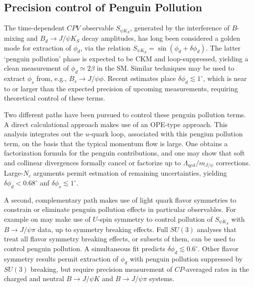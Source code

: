 \subsection{Precision control of Penguin Pollution}
The time-dependent $CPV$ observable $S_{\psi K_S}$, generated by the interference of $B$-mixing and $B_d \to J/\psi K_S$ decay amplitudes, has long been considered a golden mode for extraction of $\phi_d$, via the relation $S_{\psi K_S} = \sin (\phi_d + \delta \phi_d)$. The latter `penguin pollution' phase is expected to be CKM and loop-suppressed, yielding a clean measurement of $\phi_d \simeq 2 \beta$ in the SM. Similar techniques may be used to extract $\phi_s$ from, e.g., $B_s \to J/\psi \phi$. Recent estimates place $\delta \phi_d \lesssim 1^\circ$, which is near to or larger than the expected precision of upcoming measurements, requiring theoretical control of these terms.

Two different paths have been pursued to control these penguin pollution terms. A direct calculational approach makes use of an OPE-type approach. This analysis integrates out the $u$-quark loop, associated with this pengiun pollution term, on the basis that the typical momentum flow is large. One obtains a factorization formula for the penguin contributions, and one may show that soft and collinear divergences formally cancel or factorize up to $\Lambda_{\text{qcd}}/m_{J/\psi}$ corrections. Large-$N_c$ arguments permit estmation of remaining uncertainties, yielding $\delta \phi_d < 0.68^\circ$ anf $\delta \phi_s \lesssim 1^\circ$. 

A second, complementary path makes use of light quark flavor symmetries to constrain or eliminate penguin pollution effects in particular observables. For example on may make use of $U$-spin symmetry to  control pollution of $S_{\psi K_S}$ with $B \to J/\psi \pi$ data, up to symmetry breaking effects. Full $SU(3)$ analyses that treat all flavor symmetry breaking effects, or subsets of them, can be used to control penguin pollution. A simultaneous fit predicts $\delta \phi_d \lesssim 0.6^\circ$. Other flavor symmetry results permit extraction of $\phi_d$ with  penguin pollution suppressed by $SU(3)$ breaking, but require precision measurement of $CP$-averaged rates in the charged and neutral $B \to J/\psi K$ and $B \to J/\psi \pi$ systems.


